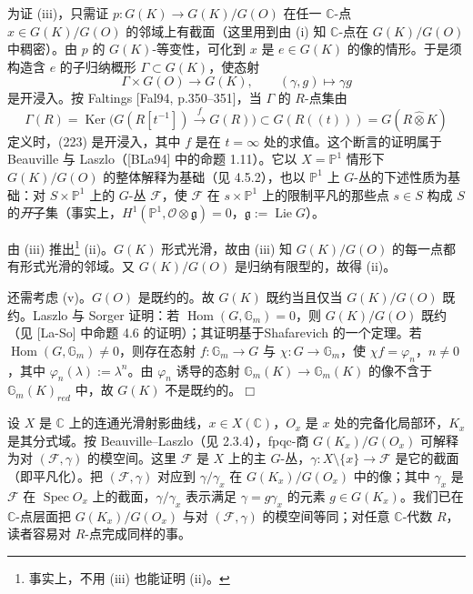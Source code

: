 为证 (iii)，只需证 $p:G(K)\to G(K)/G(O)$ 在任一 $\mathbb{C}$-点 $x\in G(K)/G(O)$ 的邻域上有截面（这里用到由 (i) 知 $\mathbb{C}$-点在 $G(K)/G(O)$ 中稠密）。由 $p$ 的 $G(K)$-等变性，可化到 $x$ 是 $e\in G(K)$ 的像的情形。于是须构造含 $e$ 的子归纳概形 $\Gamma\subset G(K)$，使态射
\begin{equation}\tag{223}
\Gamma\times G(O)\to G(K),\qquad (\gamma,g)\mapsto\gamma g
\end{equation}
是开浸入。按 Faltings [Fal94, p.350–351]，当 $\Gamma$ 的 $R$-点集由
\[
\Gamma(R)=\operatorname{Ker}\bigl(G(R[t^{-1}])\xrightarrow{f}G(R)\bigr)\subset G(R((t)))=G(R\hat\otimes K)
\]
定义时，(223) 是开浸入，其中 $f$ 是在 $t=\infty$ 处的求值。这个断言的证明属于 Beauville 与 Laszlo（[BLa94] 中的命题 1.11）。它以 $X=\mathbb{P}^1$ 情形下 $G(K)/G(O)$ 的整体解释为基础（见 4.5.2），也以 $\mathbb{P}^1$ 上 $G$-丛的下述性质为基础：对 $S\times\mathbb{P}^1$ 上的 $G$-丛 $\mathcal{F}$，使 $\mathcal{F}$ 在 $s\times\mathbb{P}^1$ 上的限制平凡的那些点 $s\in S$ 构成 $S$ 的\emph{开}子集（事实上，$H^1(\mathbb{P}^1,\mathcal{O}\otimes\mathfrak{g})=0$，$\mathfrak{g}:=\operatorname{Lie} G$）。

由 (iii) 推出\footnote{事实上，不用 (iii) 也能证明 (ii)。} (ii)。$G(K)$ 形式光滑，故由 (iii) 知 $G(K)/G(O)$ 的每一点都有形式光滑的邻域。又 $G(K)/G(O)$ 是归纳有限型的，故得 (ii)。

还需考虑 (v)。$G(O)$ 是既约的。故 $G(K)$ 既约当且仅当 $G(K)/G(O)$ 既约。Laszlo 与 Sorger 证明：若 $\operatorname{Hom}(G,\mathbb{G}_m)=0$，则 $G(K)/G(O)$ 既约（见 [La-So] 中命题 4.6 的证明）；其证明基于Shafarevich 的一个定理。若 $\operatorname{Hom}(G,\mathbb{G}_m)\ne 0$，则存在态射 $f:\mathbb{G}_m\to G$ 与 $\chi:G\to\mathbb{G}_m$，使 $\chi f=\varphi_n$，$n\ne 0$，其中 $\varphi_n(\lambda):=\lambda^n$。由 $\varphi_n$ 诱导的态射 $\mathbb{G}_m(K)\to\mathbb{G}_m(K)$ 的像不含于 $\mathbb{G}_m(K)_{red}$ 中，故 $G(K)$ 不是既约的。\hfill$\Box$

 设 $X$ 是 $\mathbb{C}$ 上的连通光滑射影曲线，$x\in X(\mathbb{C})$，$O_x$ 是 $x$ 处的完备化局部环，$K_x$ 是其分式域。按 Beauville–Laszlo（见 2.3.4），fpqc-商 $G(K_x)/G(O_x)$ 可解释为对 $(\mathcal{F},\gamma)$ 的模空间。这里 $\mathcal{F}$ 是 $X$ 上的主 $G$-丛，$\gamma:X\setminus\{x\}\to\mathcal{F}$ 是它的截面（即平凡化）。把 $(\mathcal{F},\gamma)$ 对应到 $\gamma/\gamma_x$ 在 $G(K_x)/G(O_x)$ 中的像；其中 $\gamma_x$ 是 $\mathcal{F}$ 在 $\operatorname{Spec} O_x$ 上的截面，$\gamma/\gamma_x$ 表示满足 $\gamma=g\gamma_x$ 的元素 $g\in G(K_x)$。我们已在 $\mathbb{C}$-点层面把 $G(K_x)/G(O_x)$ 与对 $(\mathcal{F},\gamma)$ 的模空间等同；对任意 $\mathbb{C}$-代数 $R$，读者容易对 $R$-点完成同样的事。

